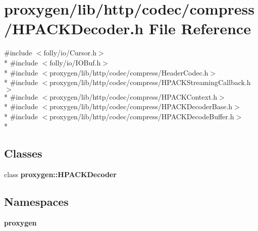 \section{proxygen/lib/http/codec/compress/\+H\+P\+A\+C\+K\+Decoder.h File Reference}
\label{HPACKDecoder_8h}
{\ttfamily \#include $<$folly/io/\+Cursor.\+h$>$}\\*
{\ttfamily \#include $<$folly/io/\+I\+O\+Buf.\+h$>$}\\*
{\ttfamily \#include $<$proxygen/lib/http/codec/compress/\+Header\+Codec.\+h$>$}\\*
{\ttfamily \#include $<$proxygen/lib/http/codec/compress/\+H\+P\+A\+C\+K\+Streaming\+Callback.\+h$>$}\\*
{\ttfamily \#include $<$proxygen/lib/http/codec/compress/\+H\+P\+A\+C\+K\+Context.\+h$>$}\\*
{\ttfamily \#include $<$proxygen/lib/http/codec/compress/\+H\+P\+A\+C\+K\+Decoder\+Base.\+h$>$}\\*
{\ttfamily \#include $<$proxygen/lib/http/codec/compress/\+H\+P\+A\+C\+K\+Decode\+Buffer.\+h$>$}\\*
\subsection*{Classes}
\begin{DoxyCompactItemize}
\item 
class {\bf proxygen\+::\+H\+P\+A\+C\+K\+Decoder}
\end{DoxyCompactItemize}
\subsection*{Namespaces}
\begin{DoxyCompactItemize}
\item 
 {\bf proxygen}
\end{DoxyCompactItemize}
